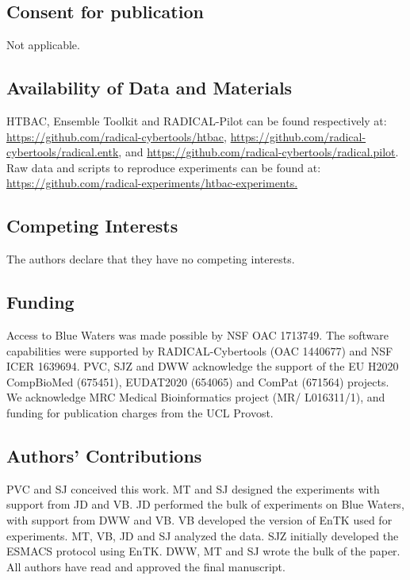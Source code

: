 \documentclass{bmcart}
\begin{document}

\subsection*{Consent for publication}
Not applicable. 

\subsection*{Availability of Data and Materials}
HTBAC, Ensemble Toolkit and
RADICAL-Pilot can be found respectively at:
\url{https://github.com/radical-cybertools/htbac},
\url{https://github.com/radical-cybertools/radical.entk}, and
\url{https://github.com/radical-cybertools/radical.pilot}. Raw data and
scripts to reproduce experiments can be found at:
\url{https://github.com/radical-experiments/htbac-experiments.}

\subsection*{Competing Interests}
The authors declare that they have no competing interests.

\subsection*{Funding}
Access to Blue Waters was made possible by NSF OAC 1713749. The software
capabilities were supported by RADICAL-Cybertools (OAC 1440677) and NSF ICER
1639694. PVC, SJZ and DWW acknowledge the support of the EU
H2020 CompBioMed (675451), EUDAT2020 (654065) and ComPat (671564) projects. 
We acknowledge MRC Medical Bioinformatics project (MR/ L016311/1), 
and funding for publication charges from the UCL Provost. 

\subsection*{Authors' Contributions}
PVC and SJ conceived this work. MT and SJ
designed the experiments with support from JD and VB. JD performed the bulk of
experiments on Blue Waters, with support from DWW and VB. VB developed the
version of EnTK used for experiments. MT, VB, JD and SJ analyzed the data. SJZ
initially developed the ESMACS protocol using EnTK. DWW, MT and SJ wrote the
bulk of the paper. All authors have read and approved the final manuscript. 
\end{document}
